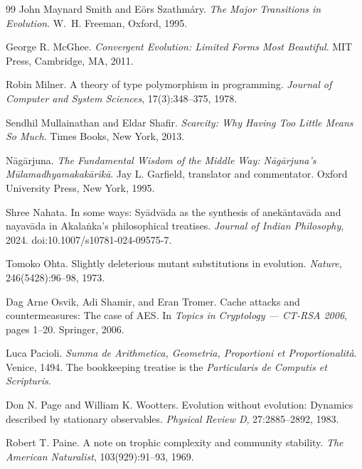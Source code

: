 \documentclass[11pt,a4paper]{article}
\theoremstyle{remark}\newtheorem{remark}[definition]{Remark}
\begin{document}
\begin{thebibliography}{99}
John Maynard Smith and E\"ors Szathm\'ary.
\newblock \emph{The Major Transitions in Evolution}.
\newblock W.~H. Freeman, Oxford, 1995.

George R. McGhee.
\newblock \emph{Convergent Evolution: Limited Forms Most Beautiful}.
\newblock MIT Press, Cambridge, MA, 2011.

Robin Milner.
\newblock A theory of type polymorphism in programming.
\newblock \emph{Journal of Computer and System Sciences}, 17(3):348--375, 1978.

Sendhil Mullainathan and Eldar Shafir.
\newblock \emph{Scarcity: Why Having Too Little Means So Much}.
\newblock Times Books, New York, 2013.

N\={a}g\={a}rjuna.
\newblock \emph{The Fundamental Wisdom of the Middle Way: N\={a}g\={a}rjuna's M\={u}lamadhyamakak\={a}rik\={a}}.
\newblock Jay L. Garfield, translator and commentator. Oxford University Press, New York, 1995.

Shree Nahata.
\newblock In some ways: Sy\=adv\=ada as the synthesis of anek\=antav\=ada and nayav\=ada in Akala\.nka's philosophical treatises.
\newblock \emph{Journal of Indian Philosophy}, 2024.
\newblock doi:10.1007/s10781-024-09575-7.

Tomoko Ohta.
\newblock Slightly deleterious mutant substitutions in evolution.
\newblock \emph{Nature}, 246(5428):96--98, 1973.

Dag Arne Osvik, Adi Shamir, and Eran Tromer.
\newblock Cache attacks and countermeasures: The case of AES.
\newblock In \emph{Topics in Cryptology --- CT-RSA 2006}, pages 1--20. Springer, 2006.

Luca Pacioli.
\newblock \emph{Summa de Arithmetica, Geometria, Proportioni et Proportionalit\`a}.
\newblock Venice, 1494.
\newblock The bookkeeping treatise is the \emph{Particularis de Computis et Scripturis}.

Don N. Page and William K. Wootters.
\newblock Evolution without evolution: Dynamics described by stationary observables.
\newblock \emph{Physical Review D}, 27:2885--2892, 1983.

Robert T. Paine.
\newblock A note on trophic complexity and community stability.
\newblock \emph{The American Naturalist}, 103(929):91--93, 1969.


\end{thebibliography}
\end{document}
